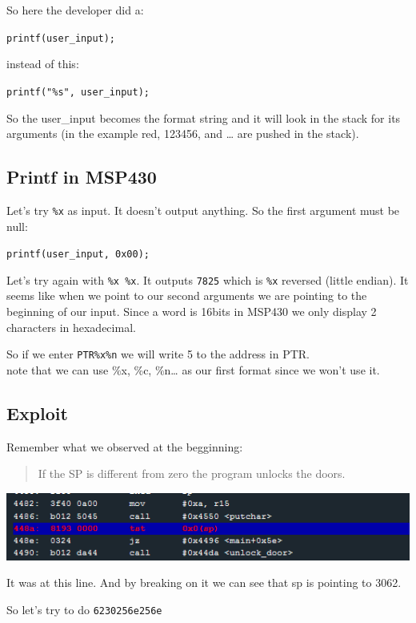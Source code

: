 So here the developer did a:

\texttt{printf(user\_input);}

instead of this:

\texttt{printf("\%s", user\_input);}

So the user\_input becomes the format string and it will look in the
stack for its arguments (in the example red, 123456, and \ldots{} are
pushed in the stack).

\subsection{Printf in MSP430}\label{printf-in-msp430}

Let's try \texttt{\%x} as input. It doesn't output anything. So the
first argument must be null:

\texttt{printf(user\_input, 0x00);}

Let's try again with \texttt{\%x \%x}. It outputs \texttt{7825} which is
\texttt{\%x} reversed (little endian). It seems like when we point to
our second arguments we are pointing to the beginning of our input.
Since a word is 16bits in MSP430 we only display 2 characters in
hexadecimal.

So if we enter \texttt{PTR\%x\%n} we will write 5 to the address in
PTR.\\note that we can use \%x, \%c, \%n\ldots{} as our first format
since we won't use it.

\subsection{Exploit}\label{exploit}

Remember what we observed at the begginning:

\begin{quote}
If the SP is different from zero the program unlocks the doors.
\end{quote}

\includegraphics{img/12_5.PNG}

It was at this line. And by breaking on it we can see that sp is
pointing to 3062.

So let's try to do \texttt{6230256e256e}

